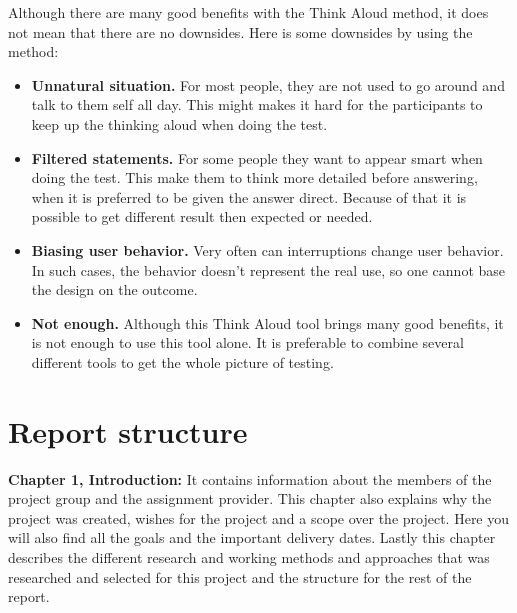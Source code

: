 Although there are many good benefits with the Think Aloud method, it does not mean that there are no downsides. Here is some downsides by using the method: \cite{Think_Aloud} 
\begin{itemize}
  \item \textbf{Unnatural situation.} For most people, they are not used to go around and talk to them self all day. This might makes it hard for the participants to keep up the thinking aloud when doing the test. 
  \item \textbf{Filtered statements.} For some people they want to appear smart when doing the test. This make them to think more detailed before answering, when it is preferred to be given the answer direct. Because of that it is possible to get different result then expected or needed. 
  \item \textbf{Biasing user behavior.} Very often can interruptions change user behavior. In such cases, the behavior doesn't represent the real use, so one cannot base the design on the outcome.
  \item \textbf{Not enough.} Although this Think Aloud tool brings many good benefits, it is not enough to use this tool alone. It is preferable to combine several different tools to get the whole picture of testing.
\end{itemize}

\newpage
\section{Report structure} 
\textbf{Chapter 1, Introduction:}
It contains information about the members of the project group and the assignment provider. This chapter also explains why the project was created, wishes for the project and a scope over the project. Here you will also find all the goals and the important delivery dates. Lastly this chapter describes the different research and working methods and approaches that was researched and selected for this project and the structure for the rest of the report. 


